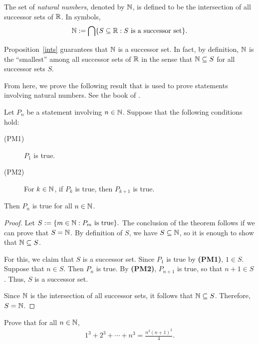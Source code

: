 \begin{defn}\label{nat}
	\parencite{BkEx} The set of \textit{natural numbers}, denoted by $\mathbb{N}$, is defined to be the intersection of all successor sets of $\mathbb{R}$. In symbols,
	\[
	\mathbb{N}:=\bigcap\{S\subseteq\mathbb{R}: S\text{ is a successor set}\}.
	\]
\end{defn}

Proposition~\ref{ints} guarantees that $\mathbb{N}$ is a successor set. In fact, by definition, $\mathbb{N}$ is the ``smallest'' among all successor sets of $\mathbb{R}$ in the sense that $\mathbb{N}\subseteq S$ for all successor sets $S$.

From here, we prove the following result that is used to prove statements involving natural numbers. See the book of \textcite{BkEx}.

\begin{thm}\label{pmi}
	Let $P_n$ be a statement involving $n\in\mathbb{N}$. Suppose that the following conditions hold:
	\begin{description}
		\item[(PM1)] $P_1$ is true.
		\item[(PM2)] For $k\in\mathbb{N}$, if $P_k$ is true, then $P_{k+1}$ is true.
	\end{description}
	Then $P_n$ is true for all $n\in\mathbb{N}$.
\end{thm}

\begin{proof}
	Let $S:=\{m\in\mathbb{N}: P_m\text{ is true}\}.$ The conclusion of the theorem follows if we can prove that $S=\mathbb{N}$. By definition of $S$, we have $S\subseteq\mathbb{N}$, so it is enough to show that $\mathbb{N}\subseteq S$.
	
	For this, we claim that $S$ is a successor set. Since $P_1$ is true by \textbf{(PM1)}, $1\in S$. Suppose that $n\in S$. Then $P_n$ is true. By \textbf{(PM2)}, $P_{n+1}$ is true, so that $n+1\in S$. Thus, $S$ is a successor set.
	
	Since $\mathbb{N}$ is the intersection of all successor sets, it follows that $\mathbb{N}\subseteq S$. Therefore, $S=\mathbb{N}$.
\end{proof}

\begin{ex}
	Prove that for all $n\in\mathbb{N}$,
	\begin{align}\label{pmiex}
		1^3 + 2^3 + \cdots + n^3 = \frac{n^2(n+1)^2}{4}.
	\end{align}
\end{ex}

